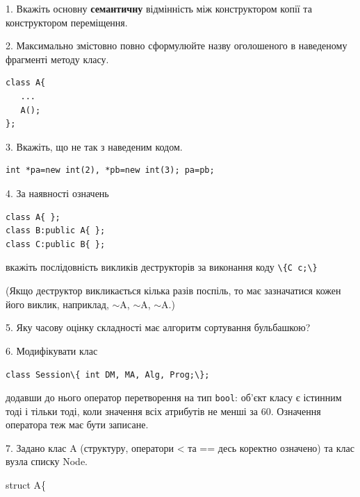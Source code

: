 \documentclass[12pt, ukrainian]{article}
\def\code#1{\Verb!#1!}
\begin{document}
{%
1. Вкажіть основну \textbf{семантичну} відмінність між конструктором копії та конструктором переміщення.%
\par
\vspace{2mm}
2. Максимально змістовно повно сформулюйте назву оголошеного в наведеному фрагменті методу класу.
\vspace{-3mm}
\begin{verbatim}class A{
   ...
   A();
};\end{verbatim}
\vspace{-3mm}
\par
\vspace{2mm}
3. Вкажіть, що не так з наведеним кодом.
\vspace{-3mm}
\begin{verbatim}int *pa=new int(2), *pb=new int(3); pa=pb;\end{verbatim}
\vspace{-3mm}
\par
\vspace{2mm}
4. За наявності означень
\vspace{-3mm}
\begin{verbatim}
class A{ };
class B:public A{ };
class C:public B{ };\end{verbatim}
\vspace{-3mm}
вкажіть послідовність викликів деструкторів за виконання коду \code{\{C c;\}} 

(Якщо деструктор викликається кілька разів поспіль, то має зазначатися кожен його виклик, наприклад, $\sim$A, $\sim$A, $\sim$A.)

\vspace{2mm}
5. Яку часову оцінку складності має алгоритм сортування бульбашкою?
\par
\vspace{2mm}
6. Модифікувати клас 

\qquad\code{class Session\{ int DM, MA, Alg, Prog;\};} 


додавши до нього оператор перетворення на тип \code{bool}: об'єкт класу є істинним тоді і тільки тоді, коли значення всіх атрибутів не менші за 60. Означення оператора теж має бути записане.%
\par
\vspace{2mm}
7. 
Задано клас A (структуру, оператори < та == десь коректно означено) та клас вузла списку Node.

struct A\{

}
\end{document}
